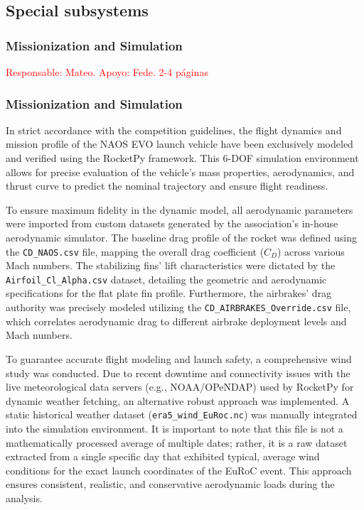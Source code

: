 \documentclass[11pt, a4paper]{article} %
\begin{document}
\subsection{Special subsystems} 

\subsubsection{Missionization and Simulation}
\textcolor{red}{Responsable: Mateo. Apoyo: Fede. 2-4 páginas}

\subsubsection{Missionization and Simulation}

In strict accordance with the competition guidelines, the flight dynamics and mission profile of the NAOS EVO launch vehicle have been exclusively modeled and verified using the RocketPy framework. This 6-DOF simulation environment allows for precise evaluation of the vehicle's mass properties, aerodynamics, and thrust curve to predict the nominal trajectory and ensure flight readiness.

To ensure maximum fidelity in the dynamic model, all aerodynamic parameters were imported from custom datasets generated by the association's in-house aerodynamic simulator. The baseline drag profile of the rocket was defined using the \texttt{CD\_NAOS.csv} file, mapping the overall drag coefficient ($C_D$) across various Mach numbers. The stabilizing fins' lift characteristics were dictated by the \texttt{Airfoil\_Cl\_Alpha.csv} dataset, detailing the geometric and aerodynamic specifications for the flat plate fin profile. Furthermore, the airbrakes' drag authority was precisely modeled utilizing the \texttt{CD\_AIRBRAKES\_Override.csv} file, which correlates aerodynamic drag to different airbrake deployment levels and Mach numbers.

To guarantee accurate flight modeling and launch safety, a comprehensive wind study was conducted. Due to recent downtime and connectivity issues with the live meteorological data servers (e.g., NOAA/OPeNDAP) used by RocketPy for dynamic weather fetching, an alternative robust approach was implemented. A static historical weather dataset (\texttt{era5\_wind\_EuRoc.nc}) was manually integrated into the simulation environment. It is important to note that this file is not a mathematically processed average of multiple dates; rather, it is a raw dataset extracted from a single specific day that exhibited typical, average wind conditions for the exact launch coordinates of the EuRoC event. This approach ensures consistent, realistic, and conservative aerodynamic loads during the analysis.
\end{document}
